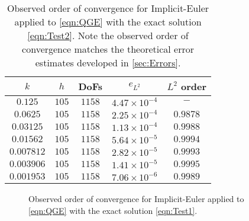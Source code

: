 \begin{table}
  \begin{center}
    \begin{tabular}{|c|c|c|c|c|}
      \hline
      $k$ & $h$ & DoFs & $e_{L^2}$ & $L^2$ order \\%
      \hline
$0.125$ & $105$ & $1158$ & $4.47\times 10^{-4}$ & $-$ \\%
$0.0625$ & $105$ & $1158$ & $2.25\times 10^{-4}$ & $0.9878$ \\%
$0.03125$ & $105$ & $1158$ & $1.13\times 10^{-4}$ & $0.9988$ \\%
$0.01562$ & $105$ & $1158$ & $5.64\times 10^{-5}$ & $0.9994$ \\%
$0.007812$ & $105$ & $1158$ & $2.82\times 10^{-5}$ & $0.9993$ \\%
$0.003906$ & $105$ & $1158$ & $1.41\times 10^{-5}$ & $0.9995$ \\%
$0.001953$ & $105$ & $1158$ & $7.06\times 10^{-6}$ & $0.9989$ \\%

      \hline

    \end{tabular}
  \end{center}
  \caption{Observed order of convergence for Implicit-Euler applied to
    \eqref{eqn:QGE} with the exact solution \eqref{eqn:Test2}. Note the observed
    order of convergence matches the theoretical error estimates developed in
    \autoref{sec:Errors}.}
  \label{tab:Test1}
\end{table}

\begin{figure}
  \begin{center}
    \caption{Observed order of convergence for Implicit-Euler applied to
      \eqref{eqn:QGE} with the exact solution \eqref{eqn:Test1}.}
  \label{fig:Test1}
  \end{center}
\end{figure}

